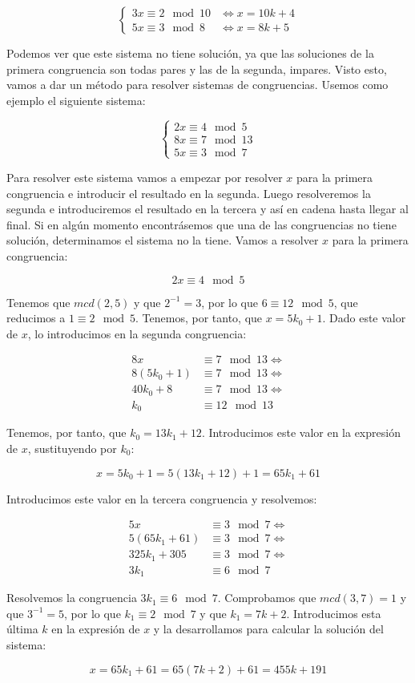 \[
\left\{
\begin{array}{ll}
	3x \equiv 2 \mod 10 & \iff x = 10k + 4 \\
	5x \equiv 3 \mod 8  & \iff x = 8k + 5
\end{array}
\right.
\]

Podemos ver que este sistema no tiene solución, ya que las soluciones de la primera congruencia son todas pares y las de la segunda, impares.
Visto esto, vamos a dar un método para resolver sistemas de congruencias.
Usemos como ejemplo el siguiente sistema:

\[
\left\{
\begin{array}{l}
	2x \equiv 4 \mod 5 \\
	8x \equiv 7 \mod 13 \\
	5x \equiv 3 \mod 7
\end{array}
\right.
\]

Para resolver este sistema vamos a empezar por resolver $x$ para la primera congruencia e introducir el resultado en la segunda.
Luego resolveremos la segunda e introduciremos el resultado en la tercera y así en cadena hasta llegar al final.
Si en algún momento encontrásemos que una de las congruencias no tiene solución, determinamos el sistema no la tiene.
Vamos a resolver $x$ para la primera congruencia:

\[2x \equiv 4 \mod 5\]

Tenemos que $mcd(2,5)$ y que $2^{-1} = 3$, por lo que $6 \equiv 12 \mod 5$, que reducimos a $1 \equiv 2 \mod 5$.
Tenemos, por tanto, que $x = 5k_0 + 1$.
Dado este valor de $x$, lo introducimos en la segunda congruencia:

\[
\begin{array}{ll}
	8x          & \equiv 7  \mod 13 \iff \\
	8(5k_0 + 1) & \equiv 7  \mod 13 \iff \\
	40k_0 + 8   & \equiv 7  \mod 13 \iff \\
	k_0         & \equiv 12 \mod 13
\end{array}
\]

Tenemos, por tanto, que $k_0 = 13k_1 + 12$.
Introducimos este valor en la expresión de $x$, sustituyendo por $k_0$:

\[
	x = 5k_0 + 1 = 5(13k_1 + 12) + 1 = 65k_1 + 61
\]

Introducimos este valor en la tercera congruencia y resolvemos:

\[
\begin{array}{ll}
	5x            & \equiv 3 \mod 7 \iff \\
	5(65k_1 + 61) & \equiv 3 \mod 7 \iff \\
	325k_1 + 305  & \equiv 3 \mod 7 \iff \\
	3k_1          & \equiv 6 \mod 7
\end{array}
\]

Resolvemos la congruencia $3k_1 \equiv 6 \mod 7$.
Comprobamos que $mcd(3,7) = 1$ y que $3^{-1} = 5$, por lo que $k_1 \equiv 2 \mod 7$ y que $k_1 = 7k + 2$.
Introducimos esta última $k$ en la expresión de $x$ y la desarrollamos para calcular la solución del sistema:

\[x = 65k_1 + 61 = 65(7k + 2) + 61 = 455k + 191\]
